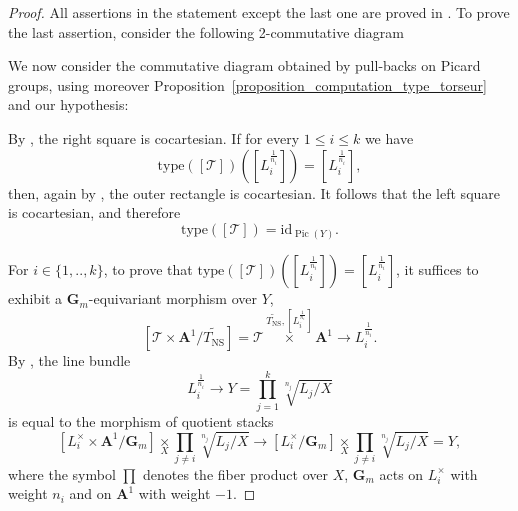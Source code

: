 \documentclass{proc-l}
\newcommand{\Z}{\mathbf{Z}}
\newcommand{\G}{\mathbf{G}}
\DeclareMathOperator{\Pic}{Pic}
\DeclareMathOperator{\NS}{NS}
\newcommand{\stackT}{\mathcal{T}}
\newcommand{\affine}{\mathbf{A}}
\theoremstyle{definition}
\theoremstyle{remark}
\numberwithin{equation}{section}
\begin{document}
\begin{proof}
All assertions in the statement except the last one are proved in \cite[Lemma 7.1 (2)]{fantechi_toric_stack}. To prove the last assertion, consider the following 2-commutative diagram
\begin{center}
\end{center}

We now consider the commutative diagram obtained by pull-backs on Picard groups, using moreover Proposition~\ref{proposition_computation_type_torseur} and our hypothesis:
\begin{center}
\end{center}By \cite[Remark~7.4]{fantechi_toric_stack}, the right square is cocartesian. 
If for every $1 \leqslant i \leqslant k$ we have
\[
\mathrm{type}([\stackT])\!\left([L_i^{\frac{1}{n_i}}]\right)
= [L_i^{\frac{1}{n_i}}],
\]
then, again by \cite[Remark~7.4]{fantechi_toric_stack}, the outer rectangle is cocartesian. 
It follows that the left square is cocartesian, and therefore
\[
\mathrm{type}([\stackT]) = \mathrm{id}_{\Pic(Y)}.
\]

For $i \in \{1,..,k\}$, to prove that $\mathrm{type}([\stackT])\left([L_i^{\frac{1}{n_i}}]\right) = [L_i^{\frac{1}{n_i}}]$, it suffices to exhibit a $\G_m$-equivariant morphism over $Y$,
$$
[\stackT \times \affine^1 / \widetilde{T_{\NS}}] = \stackT \overset{\widetilde{T_{\NS}},[L_i^{\frac{1}{n_i}}]} {\times} \affine^1 \longrightarrow L_i^{\frac{1}{n_i}} .
$$
By \cite[Appendix B]{abramovich2008gromovwittentheorydelignemumfordstacks}, the line bundle
$$
L_i^{\frac{1}{n_i}} \rightarrow Y = \prod_{j=1}^k \sqrt[n_j]{L_j/X}
$$
is equal to the morphism of quotient stacks
$$
 [L_i^{\times} \times \affine^1 / \G_m] \underset{X}{\times} \prod_{j \neq i} \sqrt[n_j]{L_j/X} \rightarrow [L_i^{\times} / \G_m ] \underset{X}{\times} \prod_{j \neq i} \sqrt[n_j]{L_j/X} = Y,
$$
where the symbol $\prod$ denotes the fiber product over $X$, $\G_m$ acts on $L_i^{\times}$ with weight $n_i$ and on $\affine^1$ with weight $- 1$.


\end{proof}
\end{document}
